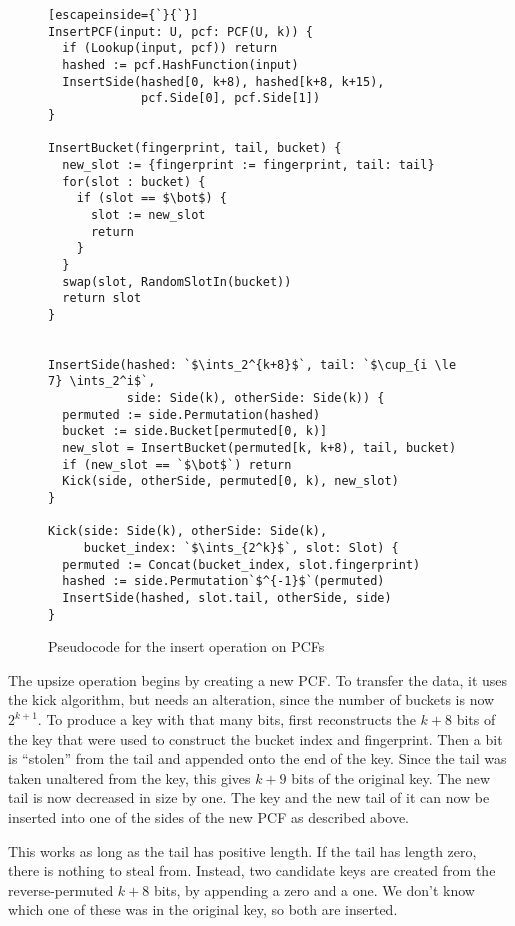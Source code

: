 \documentclass[letterpaper, 11pt]{article}
\newcommand{\ints}{\mathbb{Z}}
\begin{document}
\begin{figure}
\begin{lstlisting}[escapeinside={`}{`}]
InsertPCF(input: U, pcf: PCF(U, k)) {
  if (Lookup(input, pcf)) return
  hashed := pcf.HashFunction(input)
  InsertSide(hashed[0, k+8), hashed[k+8, k+15),
             pcf.Side[0], pcf.Side[1])
}

InsertBucket(fingerprint, tail, bucket) {
  new_slot := {fingerprint := fingerprint, tail: tail}
  for(slot : bucket) {
    if (slot == $\bot$) {
      slot := new_slot
      return
    }
  }
  swap(slot, RandomSlotIn(bucket))
  return slot
}


InsertSide(hashed: `$\ints_2^{k+8}$`, tail: `$\cup_{i \le 7} \ints_2^i$`,
           side: Side(k), otherSide: Side(k)) {
  permuted := side.Permutation(hashed)
  bucket := side.Bucket[permuted[0, k)]
  new_slot = InsertBucket(permuted[k, k+8), tail, bucket)
  if (new_slot == `$\bot$`) return
  Kick(side, otherSide, permuted[0, k), new_slot)
}

Kick(side: Side(k), otherSide: Side(k),
     bucket_index: `$\ints_{2^k}$`, slot: Slot) {
  permuted := Concat(bucket_index, slot.fingerprint)
  hashed := side.Permutation`$^{-1}$`(permuted)
  InsertSide(hashed, slot.tail, otherSide, side)
}
\end{lstlisting}
\caption{Pseudocode for the insert operation on PCFs}
\end{figure}

The upsize operation begins by creating a new PCF.
To transfer the data, it uses the kick algorithm, but needs an alteration, since the number of buckets is now $2^{k+1}$.
To produce a key with that many bits, first reconstructs the $k+8$ bits of the key that were used to construct the bucket index and fingerprint.
Then a bit is ``stolen'' from the tail and appended onto the end of the key.
Since the tail was taken unaltered from the key, this gives $k+9$ bits of the original key.
The new tail is now decreased in size by one.
The key and the new tail of it can now be inserted into one of the sides of the new PCF as described above.

This works as long as the tail has positive length.
If the tail has length zero, there is nothing to steal from.
Instead, two candidate keys are created from the reverse-permuted $k+8$ bits, by appending a zero and a one.
We don't know which one of these was in the original key, so both are inserted.
\end{document}
